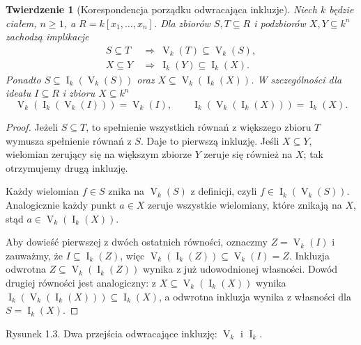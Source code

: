 \documentclass[11pt,a4paper,openany]{report}
\numberwithin{equation}{section}
\theoremstyle{plain}
\newtheorem{twierdzenie}{Twierdzenie}[section]
\theoremstyle{definition}
\theoremstyle{remark}
\newcommand{\V}{\operatorname V}
\newcommand{\I}{\operatorname I}
\begin{document}
\begin{twierdzenie}[Korespondencja porządku odwracająca inkluzje]
\label{tw:galois}
Niech $k$ będzie ciałem, $n\ge1$, a $R=k[x_1,\dots,x_n]$.
Dla zbiorów $S,T\subseteq R$ i podzbiorów $X,Y\subseteq k^n$
zachodzą implikacje
\begin{align*}
S\subseteq T&\ \Longrightarrow\ \V_k(T)\subseteq\V_k(S),\\
X\subseteq Y&\ \Longrightarrow\ \I_k(Y)\subseteq\I_k(X).
\end{align*}
Ponadto $S\subseteq\I_k(\V_k(S))$ oraz
$X\subseteq\V_k(\I_k(X))$.
W szczególności dla ideału $I\subseteq R$ i zbioru $X\subseteq k^n$
\[
\V_k(\I_k(\V_k(I)))=\V_k(I),\qquad
\I_k(\V_k(\I_k(X)))=\I_k(X).
\]
\end{twierdzenie}
\begin{proof}
Jeżeli $S\subseteq T$, to spełnienie wszystkich równań
z większego zbioru $T$ wymusza spełnienie równań z $S$.
Daje to pierwszą inkluzję. Jeśli $X\subseteq Y$, wielomian
zerujący się na większym zbiorze $Y$ zeruje się również na $X$;
tak otrzymujemy drugą inkluzję.

Każdy wielomian $f\in S$ znika na $\V_k(S)$ z definicji,
czyli $f\in\I_k(\V_k(S))$. Analogicznie każdy punkt $a\in X$
zeruje wszystkie wielomiany, które znikają na $X$, stąd
$a\in\V_k(\I_k(X))$.

Aby dowieść pierwszej z dwóch ostatnich równości, oznaczmy
$Z=\V_k(I)$ i zauważmy, że $I\subseteq\I_k(Z)$, więc
$\V_k(\I_k(Z))\subseteq\V_k(I)=Z$. Inkluzja odwrotna
$Z\subseteq\V_k(\I_k(Z))$ wynika z już udowodnionej własności.
Dowód drugiej równości jest analogiczny: z
$X\subseteq\V_k(\I_k(X))$ wynika
$\I_k(\V_k(\I_k(X)))\subseteq\I_k(X)$,
a odwrotna inkluzja wynika z własności dla $S=\I_k(X)$.
\end{proof}

\begin{center}
\end{center}
\begin{center}\small Rysunek 1.3. Dwa przejścia odwracające inkluzję: $\V_k$ i $\I_k$.\end{center}
\end{document}
